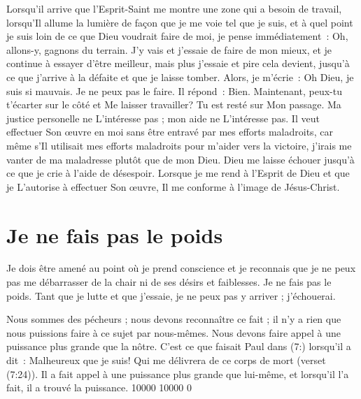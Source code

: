 Lorsqu'il arrive que l'Esprit-Saint me montre une zone qui a besoin de travail,
 lorsqu'Il allume la lumière de façon que je me voie tel que je suis,
 et à quel point je suis loin de ce que Dieu voudrait faire de moi,
 je pense immédiatement~:
 \og Oh, allons-y, gagnons du terrain. \fg{}
 J'y vais et j'essaie de faire de mon mieux,
 et je continue à essayer d'être meilleur,
 mais plus j'essaie et pire cela devient,
 jusqu'à ce que j'arrive à la défaite et que je laisse tomber.
 Alors, je m'écrie~:
 \og Oh Dieu, je suis si mauvais. Je ne peux pas le faire. \fg{}
 Il répond~:
 \og Bien. Maintenant, peux-tu t'écarter sur le côté et Me laisser travailler?
 Tu est resté sur Mon passage. \fg{}
 Ma justice personelle ne L'intéresse pas ;
 mon aide ne L'intéresse pas.
 Il veut effectuer Son œuvre en moi sans être entravé
 par mes efforts maladroits,
 car même s'Il utilisait mes efforts maladroits
 pour m'aider vers la victoire,
 j'irais me vanter de ma maladresse plutôt que de mon Dieu.
 Dieu me laisse échouer jusqu'à ce que je crie à l'aide de désespoir.
 Lorsque je me rend à l'Esprit de Dieu et que je L'autorise
 à effectuer Son œuvre, Il me conforme à l'image de Jésus-Christ.


\section{Je ne fais pas le poids}

Je dois être amené au point où je prend conscience et
 je reconnais que je ne peux pas me débarrasser de la chair
 ni de ses désirs et faiblesses.
 Je ne fais pas le poids. Tant que je lutte et que j'essaie,
 je ne peux pas y arriver ; j'échouerai.

Nous sommes des pécheurs ; nous devons reconnaître ce fait ;
 il n'y a rien que nous puissions faire à ce sujet par nous-mêmes.
 Nous devons faire appel à une puissance plus grande que la nôtre.
 C'est ce que faisait Paul dans (7:) lorsqu'il a dit~:
 \og Malheureux que je suis! Qui me délivrera de ce corps de mort \fg{}
 (verset (7:24)).
 Il a fait appel à une puissance plus grande que lui-même,
 et lorsqu'il l'a fait, il a trouvé la puissance.
 \begingroup{} 10000 10000 0
 \par\endgroup

